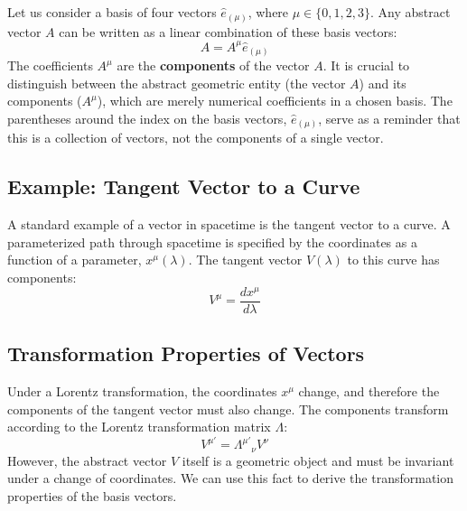 \documentclass[11pt, a4paper]{report}
\begin{document}
Let us consider a basis of four vectors $\hat{e}_{(\mu)}$, where $\mu \in \{0, 1, 2, 3\}$. Any abstract vector $A$ can be written as a linear combination of these basis vectors:
\begin{equation}
    A = A^\mu \hat{e}_{(\mu)}
\end{equation}
The coefficients $A^\mu$ are the \textbf{components} of the vector $A$. It is crucial to distinguish between the abstract geometric entity (the vector $A$) and its components ($A^\mu$), which are merely numerical coefficients in a chosen basis. The parentheses around the index on the basis vectors, $\hat{e}_{(\mu)}$, serve as a reminder that this is a collection of vectors, not the components of a single vector.

\subsection*{Example: Tangent Vector to a Curve}

A standard example of a vector in spacetime is the tangent vector to a curve. A parameterized path through spacetime is specified by the coordinates as a function of a parameter, $x^\mu(\lambda)$. The tangent vector $V(\lambda)$ to this curve has components:
\begin{equation}
    V^\mu = \frac{dx^\mu}{d\lambda}
\end{equation}

\subsection*{Transformation Properties of Vectors}

Under a Lorentz transformation, the coordinates $x^\mu$ change, and therefore the components of the tangent vector must also change. The components transform according to the Lorentz transformation matrix $\Lambda$:
\begin{equation}
    V^{\mu'} = {\Lambda^{\mu'}}_\nu V^\nu
\end{equation}
However, the abstract vector $V$ itself is a geometric object and must be invariant under a change of coordinates. We can use this fact to derive the transformation properties of the basis vectors.
\end{document}
